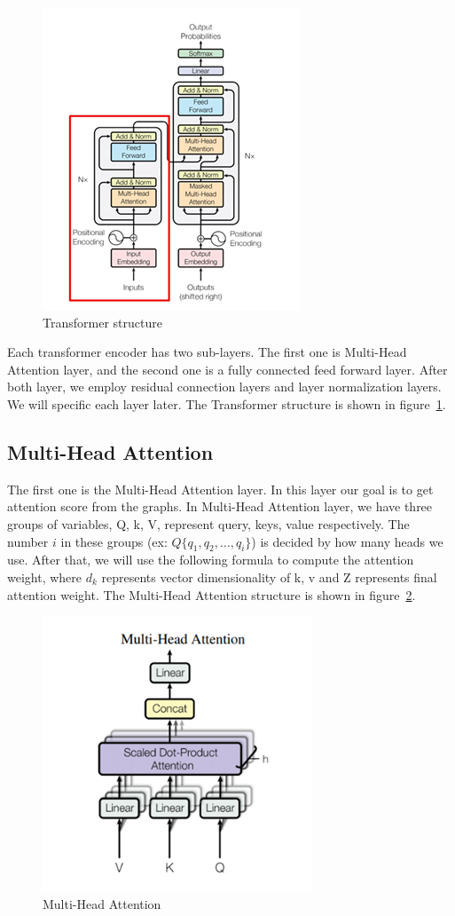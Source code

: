 \documentclass{article}
\begin{document}
\begin{figure}
    \centering
    \includegraphics[scale=0.9]{tf}
    \caption{Transformer structure}
    \label{fig:tf}
\end{figure}

Each transformer encoder has two sub-layers.
The first one is Multi-Head Attention layer,
and the second one is a fully connected feed forward layer.
After both layer, we employ residual connection layers and
layer normalization layers. We will specific each layer later.
The Transformer structure is shown in figure~\ref{fig:tf}.

\subsection{Multi-Head Attention}

The first one is the Multi-Head Attention layer.
In this layer our goal is to get attention score from the graphs.
In Multi-Head Attention layer, we have three groups of variables,
Q, k, V, represent query, keys, value respectively.
The number $i$ in these groups (ex: $Q\{q_1, q_2, \dots, q_i\}$)
is decided by how many heads we use. After that,
we will use the following formula to compute the attention weight,
where $d_k$ represents vector dimensionality of k, v and
Z represents final attention weight.
The Multi-Head Attention structure is shown in figure~\ref{fig:multihead}.

\begin{figure}
    \centering
    \includegraphics[scale=0.9]{multihead}
    \caption{Multi-Head Attention}
    \label{fig:multihead}
\end{figure}
\end{document}

